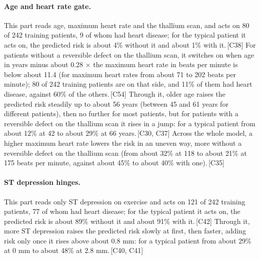 \documentclass[a4paper,10pt]{article}
\newif\ifreviewmarks
\newcommand{\reviewrule}{\noindent{\color{BrickRed}\rule{\linewidth}{0.8pt}}}
\newenvironment{drafted}[1][]{%
  \ifreviewmarks\par\addvspace{\medskipamount}\reviewrule\par\nopagebreak
  \noindent{\color{BrickRed}\sffamily\footnotesize\textbf{Thesis Draft}\quad #1\hfill review}\par\nopagebreak\smallskip\fi}{%
  \ifreviewmarks\par\smallskip\noindent{\color{BrickRed}\sffamily\footnotesize end of thesis draft}\par\nopagebreak\reviewrule\par\medskip\fi}
\begin{document}
\begin{drafted}[plain-language layer: heart-s2-c1]
\paragraph{Age and heart rate gate.} This part reads age, maximum heart rate and the thallium scan, and acts on 80 of 242 training patients, 9 of whom had heart disease; for the typical patient it acts on, the predicted risk is about 4\% without it and about 1\% with it.\,{\scriptsize\textcolor{NavyBlue}{[C38]}} For patients without a reversible defect on the thallium scan, it switches on when age in years minus about 0.28 $\times$ the maximum heart rate in beats per minute is below about 11.4 (for maximum heart rates from about 71 to 202 beats per minute); 80 of 242 training patients are on that side, and 11\% of them had heart disease, against 60\% of the others.\,{\scriptsize\textcolor{NavyBlue}{[C54]}} Through it, older age raises the predicted risk steadily up to about 56 years (between 45 and 61 years for different patients), then no further for most patients, but for patients with a reversible defect on the thallium scan it rises in a jump: for a typical patient from about 12\% at 42 to about 29\% at 66 years.\,{\scriptsize\textcolor{NavyBlue}{[C30, C37]}} Across the whole model, a higher maximum heart rate lowers the risk in an uneven way, more without a reversible defect on the thallium scan (from about 32\% at 118 to about 21\% at 175 beats per minute, against about 45\% to about 40\% with one).\,{\scriptsize\textcolor{NavyBlue}{[C35]}}
\paragraph{ST depression hinges.} This part reads only ST depression on exercise and acts on 121 of 242 training patients, 77 of whom had heart disease; for the typical patient it acts on, the predicted risk is about 89\% without it and about 91\% with it.\,{\scriptsize\textcolor{NavyBlue}{[C42]}} Through it, more ST depression raises the predicted risk slowly at first, then faster, adding risk only once it rises above about 0.8 mm: for a typical patient from about 29\% at 0 mm to about 48\% at 2.8 mm.\,{\scriptsize\textcolor{NavyBlue}{[C40, C41]}}

\end{drafted}
\end{document}
